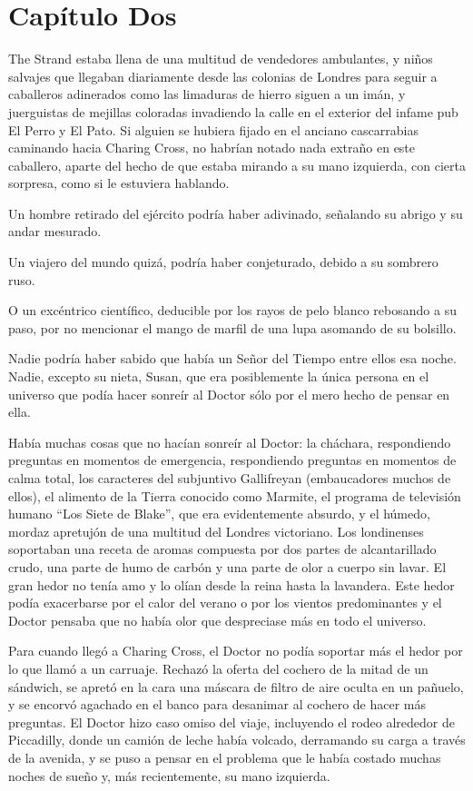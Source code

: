 \chapter*{Capítulo Dos}

The Strand estaba llena de una multitud de vendedores ambulantes, y niños salvajes que llegaban diariamente desde las colonias de Londres para seguir a caballeros adinerados como las limaduras de hierro siguen a un imán, y juerguistas de mejillas coloradas invadiendo la calle en el exterior del infame pub El Perro y El Pato. Si alguien se hubiera fijado en el anciano cascarrabias caminando hacia Charing Cross, no habrían notado nada extraño en este caballero, aparte del hecho de que estaba mirando a su mano izquierda, con cierta sorpresa, como si le estuviera hablando.
 
Un hombre retirado del ejército podría haber adivinado, señalando su abrigo y su andar mesurado.
 
Un viajero del mundo quizá, podría haber conjeturado, debido a su sombrero ruso.
 
O un excéntrico científico, deducible por los rayos de pelo blanco rebosando a su paso, por no mencionar el mango de marfil de una lupa asomando de su bolsillo.
 
Nadie podría haber sabido que había un Señor del Tiempo entre ellos esa noche. Nadie, excepto su nieta, Susan, que era posiblemente la única persona en el universo que podía hacer sonreír al Doctor sólo por el mero hecho de pensar en ella.
 
Había muchas cosas que no hacían sonreír al Doctor: la cháchara, respondiendo preguntas en momentos de emergencia, respondiendo preguntas en momentos de calma total, los caracteres del subjuntivo Gallifreyan (embaucadores muchos de ellos), el alimento de la Tierra conocido como Marmite, el programa de televisión humano ``Los Siete de Blake'', que era evidentemente absurdo, y el húmedo, mordaz apretujón de una multitud del Londres victoriano. Los londinenses soportaban una receta de aromas compuesta por dos partes de alcantarillado crudo, una parte de humo de carbón y una parte de olor a cuerpo sin lavar. El gran hedor no tenía amo y lo olían desde la reina hasta la lavandera. Este hedor podía exacerbarse por el calor del verano o por los vientos predominantes y el Doctor pensaba que no había olor que despreciase más en todo el universo.
 
Para cuando llegó a Charing Cross, el Doctor no podía soportar más el hedor por lo que llamó a un carruaje. Rechazó la oferta del cochero de la mitad de un sándwich, se apretó en la cara una máscara de filtro de aire oculta en un pañuelo, y se encorvó agachado en el banco para desanimar al cochero de hacer más preguntas. El Doctor hizo caso omiso del viaje, incluyendo el rodeo alrededor de Piccadilly, donde un camión de leche había volcado, derramando su carga a través de la avenida, y se puso a pensar en el problema que le había costado muchas noches de sueño y, más recientemente, su mano izquierda.
 
